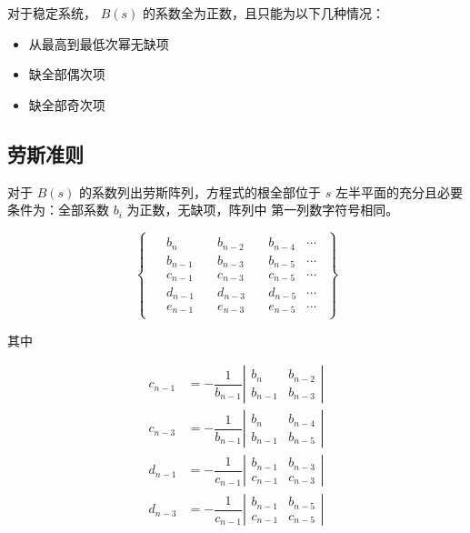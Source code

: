 \documentclass[cn,11pt,chinese,black,simple]{../elegantbook}
\begin{document}
对于稳定系统， \(B(s)\) 的系数全为正数，且只能为以下几种情况：

\begin{itemize}
    \item 从最高到最低次幂无缺项
    \item 缺全部偶次项
    \item 缺全部奇次项
\end{itemize}

\subsection{劳斯准则}

对于 \(B(s)\) 的系数列出劳斯阵列，方程式的根全部位于 \(s\) 左半平面的充分且必要
条件为：全部系数 \(b_i\) 为正数，无缺项，阵列中
第一列数字符号相同。

\[\left\{
    \begin{array}{l}
        \begin{aligned}
            &b_n \quad &b_{n-2} \quad &b_{n-4} & \cdots \\
            &b_{n-1} \quad &b_{n-3} \quad &b_{n-5} & \cdots \\
            &c_{n-1} \quad &c_{n-3} \quad &c_{n-5} & \cdots \\ 
            &d_{n-1} \quad &d_{n-3} \quad &d_{n-5} & \cdots \\ 
            &e_{n-1} \quad &e_{n-3} \quad &e_{n-5} & \cdots 
        \end{aligned}
    \end{array}
\right\}\]

其中 

\[\begin{aligned}
    c_{n-1} &=-\dfrac{1}{b_{n-1}}\left|\begin{array}{cc}
    b_{n} & b_{n-2} \\
    b_{n-1} & b_{n-3}
    \end{array}\right| \\
    c_{n-3} &=-\dfrac{1}{b_{n-1}}\left|\begin{array}{cc}
    b_{n} & b_{n-4} \\
    b_{n-1} & b_{n-5}
    \end{array}\right| \\
    d_{n-1} &=-\dfrac{1}{c_{n-1}}\left|\begin{array}{cc}
    b_{n-1} & b_{n-3} \\
    c_{n-1} & c_{n-3}
    \end{array}\right| \\
    d_{n-3} &=-\dfrac{1}{c_{n-1}}\left|\begin{array}{cc}
    b_{n-1} & b_{n-5} \\
    c_{n-1} & c_{n-5}
    \end{array}\right|
\end{aligned}\]
\end{document}
